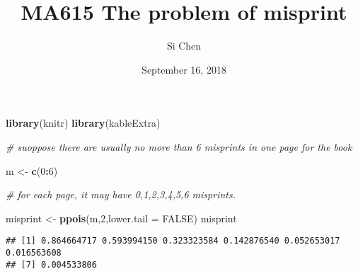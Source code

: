 \documentclass[]{article}
\title{MA615 The problem of misprint}
\author{Si Chen}
\date{September 16, 2018}
\newenvironment{Shaded}{\begin{snugshade}}{\end{snugshade}}
\newcommand{\KeywordTok}[1]{\textcolor[rgb]{0.13,0.29,0.53}{\textbf{#1}}}
\newcommand{\DataTypeTok}[1]{\textcolor[rgb]{0.13,0.29,0.53}{#1}}
\newcommand{\DecValTok}[1]{\textcolor[rgb]{0.00,0.00,0.81}{#1}}
\newcommand{\StringTok}[1]{\textcolor[rgb]{0.31,0.60,0.02}{#1}}
\newcommand{\CommentTok}[1]{\textcolor[rgb]{0.56,0.35,0.01}{\textit{#1}}}
\newcommand{\OtherTok}[1]{\textcolor[rgb]{0.56,0.35,0.01}{#1}}
\newcommand{\OperatorTok}[1]{\textcolor[rgb]{0.81,0.36,0.00}{\textbf{#1}}}
\newcommand{\NormalTok}[1]{#1}
\begin{document}
\maketitle

\begin{Shaded}
\begin{Highlighting}[]
\KeywordTok{library}\NormalTok{(knitr)}
\KeywordTok{library}\NormalTok{(kableExtra)}

\CommentTok{# suoppose there are usually no more than 6 misprints in one page for the book}

\NormalTok{m <-}\StringTok{ }\KeywordTok{c}\NormalTok{(}\DecValTok{0}\OperatorTok{:}\DecValTok{6}\NormalTok{)}

\CommentTok{# for each page, it may have 0,1,2,3,4,5,6 misprints.}

\NormalTok{misprint <-}\StringTok{ }\KeywordTok{ppois}\NormalTok{(m,}\DecValTok{2}\NormalTok{,}\DataTypeTok{lower.tail =} \OtherTok{FALSE}\NormalTok{)}
\NormalTok{misprint}
\end{Highlighting}
\end{Shaded}

\begin{verbatim}
## [1] 0.864664717 0.593994150 0.323323584 0.142876540 0.052653017 0.016563608
## [7] 0.004533806
\end{verbatim}
\end{document}
